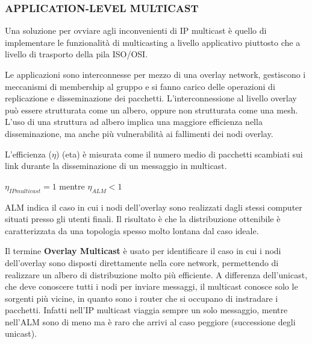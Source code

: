 \subsubsection{APPLICATION-LEVEL MULTICAST}
Una soluzione per ovviare agli inconvenienti di IP multicast è quello di implementare le funzionalità di multicasting a livello applicativo piuttosto che a livello di trasporto della pila ISO/OSI.

Le applicazioni sono interconnesse per mezzo di una overlay network, gestiscono i meccanismi di membership al gruppo e si fanno carico delle operazioni di replicazione e disseminazione dei pacchetti. L'interconnessione al livello overlay può essere strutturata come un albero, oppure non strutturata come una mesh. L'uso di una struttura ad albero implica una maggiore efficienza nella disseminazione, ma anche più vulnerabilità ai fallimenti dei nodi overlay.

L'efficienza ($\eta$) (eta) è misurata come il numero medio di pacchetti scambiati sui link durante la disseminazione di un messaggio in multicast.
\begin{center}
    $\eta_{IPmulticast} = 1$ mentre $\eta_{ALM} < 1$
\end{center}
ALM indica il caso in cui i nodi dell'overlay sono realizzati dagli stessi computer situati presso gli utenti finali. Il risultato è che la distribuzione ottenibile è caratterizzata da una topologia spesso molto lontana dal caso ideale.

Il termine \textbf{Overlay Multicast} è usato per identificare il caso in cui i nodi dell'overlay sono disposti direttamente nella core network, permettendo di realizzare un albero di distribuzione molto più efficiente. A differenza dell'unicast, che deve conoscere tutti i nodi per inviare messaggi, il multicast conosce solo le sorgenti più vicine, in quanto sono i router che si occupano di instradare i pacchetti. Infatti nell'IP multicast viaggia sempre un solo messaggio, mentre nell'ALM sono di meno ma è raro che arrivi al caso peggiore (successione degli unicast).

